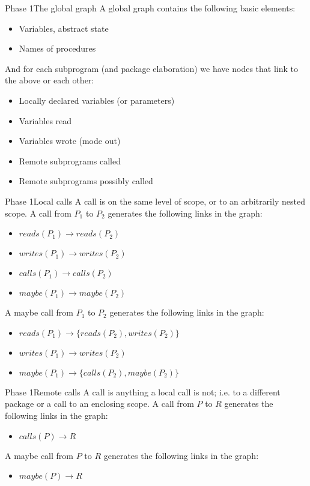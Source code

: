 \documentclass[xcolor={dvipsnames}]{beamer}
\begin{document}
\begin{frame}{Phase 1}{The global graph}
  A global graph contains the following basic elements:
  \begin{itemize}
  \item Variables, abstract state
  \item Names of procedures
  \end{itemize}

  And for each subprogram (and package elaboration) we have nodes that link
  to the above or each other:
  \begin{itemize}
  \item Locally declared variables (or parameters)
  \item Variables read
  \item Variables wrote (mode out)
  \item Remote subprograms called
  \item Remote subprograms possibly called
  \end{itemize}
\end{frame}

\begin{frame}{Phase 1}{Local calls}
  A  call is on the same level of scope, or to an
  arbitrarily nested scope. A call from $P_1$ to $P_2$ generates the
  following links in the graph:
  \begin{itemize}
  \item $reads(P_1) \rightarrow reads(P_2)$
  \item $writes(P_1) \rightarrow writes(P_2)$
  \item $calls(P_1) \rightarrow calls(P_2)$
  \item $maybe(P_1) \rightarrow maybe(P_2)$
  \end{itemize}

  A  maybe call from $P_1$ to $P_2$ generates the
  following links in the graph:
  \begin{itemize}
  \item $reads(P_1) \rightarrow \{reads(P_2), writes(P_2)\}$
  \item $writes(P_1) \rightarrow writes(P_2)$
  \item $maybe(P_1) \rightarrow \{calls(P_2), maybe(P_2)\}$
  \end{itemize}
\end{frame}

\begin{frame}{Phase 1}{Remote calls}
  A  call is anything a local call is not; i.e. to a
  different package or a call to an enclosing scope. A call from $P$ to $R$
  generates the following links in the graph:
  \begin{itemize}
  \item $calls(P) \rightarrow R$
  \end{itemize}

  A  maybe call from $P$ to $R$ generates the following
  links in the graph:
  \begin{itemize}
  \item $maybe(P) \rightarrow R$
  \end{itemize}
\end{frame}
\end{document}
